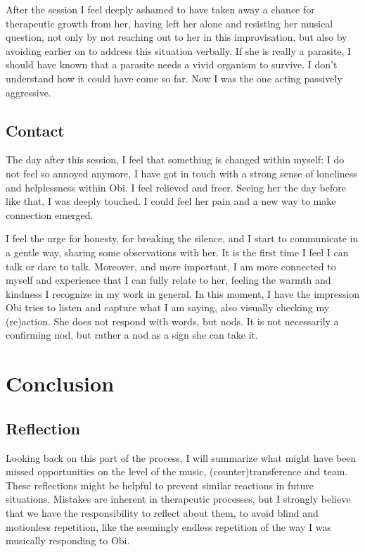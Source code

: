 \documentclass[authordate, empirical, issue]{jote-new-article}
\begin{document}
After the session I feel deeply ashamed to have taken away a chance for therapeutic growth from her, having left her alone and resisting her musical question, not only by not reaching out to her in this improvisation, but also by avoiding earlier on to address this situation verbally. If she is really a parasite, I should have known that a parasite needs a vivid organism to survive. I don't understand how it could have come so far. Now I was the one acting passively aggressive.




\subsection{Contact}



The day after this session, I feel that something is changed within myself: I do not feel so annoyed anymore, I have got in touch with a strong sense of loneliness and helplessness within Obi. I feel relieved and freer. Seeing her the day before like that, I was deeply touched. I could feel her pain and a new way to make connection emerged.



I feel the urge for honesty, for breaking the silence, and I start to communicate in a gentle way, sharing some observations with her. It is the first time I feel I can talk or dare to talk. Moreover, and more important, I am more connected to myself and experience that I can fully relate to her, feeling the warmth and kindness I recognize in my work in general. In this moment, I have the impression Obi tries to listen and capture what I am saying, also visually checking my (re)action. She does not respond with words, but nods. It is not necessarily a confirming nod, but rather a nod as a sign she can take it.


\section{Conclusion}

\subsection{Reflection}



Looking back on this part of the process, I will summarize what might have been missed opportunities on the level of the music, (counter)transference and team. These reflections might be helpful to prevent similar reactions in future situations. Mistakes are inherent in therapeutic processes, but I strongly believe that we have the responsibility to reflect about them, to avoid blind and motionless repetition, like the seemingly endless repetition of the way I was musically responding to Obi.
\end{document}
